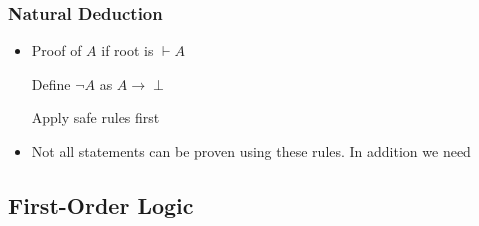 \subsubsection{Natural Deduction}
\begin{itemize}
     Assertion of the form $A_1, \dots , A_n \vdash A$, where $A, A_i$ are propositional formulae
     Leaves of a derivation tree
    \item{Proof} of $A$ if root is $\vdash A$
        \begin{itemize}
             Define $\neg A$ as $A \to \perp$
        \end{itemize}

     Apply safe rules first

    \item Not all statements can be proven using these rules. In addition we need
        \begin{itemize}
        \end{itemize}
\end{itemize}

\subsection{First-Order Logic}
